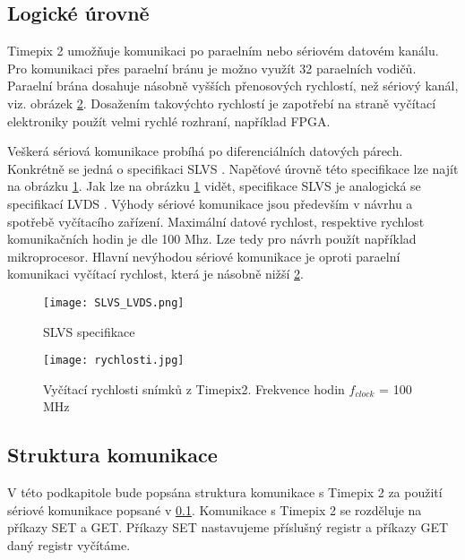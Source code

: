 \subsection{Logické úrovně} 	%
\label{kap:3.2.1}
Timepix 2 umožňuje komunikaci po paraelním nebo sériovém datovém kanálu. Pro komunikaci přes paraelní bránu je možno využít 32 paraelních vodičů. Paraelní brána dosahuje násobně vyšších přenosových rychlostí, než sériový kanál, viz. obrázek \ref{fig:rychlosti}. Dosažením takovýchto rychlostí je zapotřebí na straně vyčítací elektroniky použít velmi rychlé rozhraní, například FPGA.  
\par Veškerá sériová komunikace probíhá po diferenciálních datových párech. Konkrétně se jedná o specifikaci SLVS \cite{SLVS}. Napěťové úrovně této specifikace lze najít na obrázku \ref{fig:SLVS_LVDS}. Jak lze na obrázku \ref{fig:SLVS_LVDS} vidět, specifikace SLVS je analogická se specifikací LVDS \cite{LVDS}. Výhody sériové komunikace jsou především v návrhu a spotřebě vyčítacího zařízení. Maximální datové rychlost, respektive rychlost komunikačních hodin je dle \cite{tpx2_manual} 100 Mhz. Lze tedy pro návrh použít například mikroprocesor. Hlavní nevýhodou sériové komunikace je oproti paraelní komunikaci vyčítací rychlost, která je násobně nižší \ref{fig:rychlosti}.
\begin{figure}[h!]
	\centering
	\captionsetup{justification=centering}
	\texttt{[image: SLVS\_LVDS.png]}
	\caption{SLVS specifikace \cite{SLVS}} 
	\label{fig:SLVS_LVDS}
\end{figure}	
\begin{figure}[h!]
	\centering
	\captionsetup{justification=centering}
	\texttt{[image: rychlosti.jpg]}
	\caption{Vyčítací rychlosti snímků z Timepix2. Frekvence hodin $f_{clock}$ = 100 MHz \cite{tpx2_manual}} 
	\label{fig:rychlosti}
\end{figure}	

\subsection{Struktura komunikace}
V této podkapitole bude popsána struktura komunikace s Timepix 2 za použití sériové komunikace popsané v \ref{kap:3.2.1}.  
Komunikace s Timepix 2 se rozděluje na příkazy SET a GET. Příkazy SET nastavujeme příslušný registr a příkazy GET daný registr vyčítáme. 


